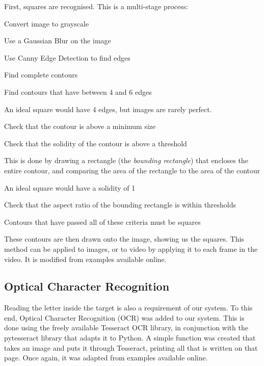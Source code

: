 \documentclass[11pt]{article}
\begin{document}
First, squares are recognised. This is a multi-stage process:
\begin{compactenum}
    \item Convert image to grayscale
    \item Use a Gaussian Blur on the image
    \item Use Canny Edge Detection to find edges
    \item Find complete contours
    \item Find contours that have between 4 and 6 edges
    \begin{compactitem}
        \item An ideal square would have 4 edges, but images are rarely perfect.
    \end{compactitem}
    \item Check that the contour is above a minimum size
    \item Check that the solidity of the contour is above a threshold
    \begin{compactitem}
        \item This is done by drawing a rectangle (the \emph{bounding rectangle}) that encloses the entire contour, and comparing the area of the rectangle to the area of the contour
        \item An ideal square would have a solidity of 1
    \end{compactitem}
    \item Check that the aspect ratio of the bounding rectangle is within thresholds
    \item Contours that have passed all of these criteria must be squares
\end{compactenum}
These contours are then drawn onto the image, showing us the squares. This method can be applied to images, or to video by applying it to each frame in the video. It is modified from examples available online\cite{opencv_tutorials}\cite{pyimagesearch_squares}.

\subsection{Optical Character Recognition}
Reading the letter inside the target is also a requirement of our system. To this end, Optical Character Recognition (OCR) was added to our system. This is done using the freely available Tesseract OCR library, in conjunction with the pytesseract library that adapts it to Python. A simple function was created that takes an image and puts it through Tesseract, printing all that is written on that page. Once again, it was adapted from examples available online\cite{pyimagesearch_ocr}.
\end{document}
